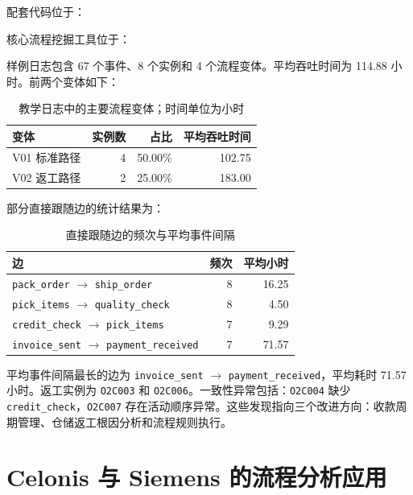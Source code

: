 配套代码位于：
\begin{center}
\end{center}
核心流程挖掘工具位于：
\begin{center}
\end{center}

样例日志包含 67 个事件、8 个实例和 4 个流程变体。平均吞吐时间为 114.88 小时。前两个变体如下：
\begin{table}[htbp]
\centering
\caption{教学日志中的主要流程变体；时间单位为小时}
\begin{tabular}{lrrr}
\toprule
\rowcolor{BDMTableHead}
变体 & 实例数 & 占比 & 平均吞吐时间\\
\midrule
V01 标准路径 & 4 & 50.00\% & 102.75\\
V02 返工路径 & 2 & 25.00\% & 183.00\\
\bottomrule
\end{tabular}
\end{table}

部分直接跟随边的统计结果为：
\begin{table}[htbp]
\centering
\caption{直接跟随边的频次与平均事件间隔}
\begin{tabular}{lrr}
\toprule
\rowcolor{BDMTableHead}
边 & 频次 & 平均小时\\
\midrule
\texttt{pack\_order} \(\rightarrow\) \texttt{ship\_order} & 8 & 16.25\\
\texttt{pick\_items} \(\rightarrow\) \texttt{quality\_check} & 8 & 4.50\\
\texttt{credit\_check} \(\rightarrow\) \texttt{pick\_items} & 7 & 9.29\\
\texttt{invoice\_sent} \(\rightarrow\) \texttt{payment\_received} & 7 & 71.57\\
\bottomrule
\end{tabular}
\end{table}

平均事件间隔最长的边为 \texttt{invoice\_sent} \(\rightarrow\) \texttt{payment\_received}，平均耗时 71.57 小时。返工实例为 \texttt{O2C003} 和 \texttt{O2C006}。一致性异常包括：\texttt{O2C004} 缺少 \texttt{credit\_check}，\texttt{O2C007} 存在活动顺序异常。这些发现指向三个改进方向：收款周期管理、仓储返工根因分析和流程规则执行。

\section{Celonis 与 Siemens 的流程分析应用}


